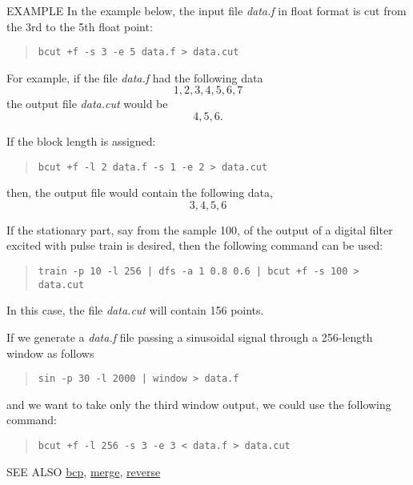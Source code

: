 \begin{qsection}{EXAMPLE}
In the example below, the input file {\em data.f} in float format
is cut from the 3rd to the 5th float point:
\begin{quote}
 \verb!bcut +f -s 3 -e 5 data.f > data.cut!
\end{quote}
For example, if the file {\em data.f} had the following data
\begin{displaymath}
  1, 2, 3, 4, 5, 6, 7
\end{displaymath}
the output file {\em data.cut} would be 
\begin{displaymath}
  4, 5, 6.
\end{displaymath}
\par
If the block length is assigned:
\begin{quote}
 \verb!bcut +f -l 2 data.f -s 1 -e 2 > data.cut!
\end{quote}
then, the output file would contain the following data,
\begin{displaymath}
  3, 4, 5, 6
\end{displaymath}
\par
If the stationary part, say from the sample 100,
of the output of a digital filter excited with
pulse train is desired, then the following command can be used:
\begin{quote}
  \verb!train -p 10 -l 256 | dfs -a 1 0.8 0.6 | bcut +f -s 100 > data.cut!
\end{quote}
In this case, the file {\em data.cut} will contain 156 points.
\par
If we generate a {\em data.f} file passing a sinusoidal signal
through a 256-length window as follows
\begin{quote}
  \verb!sin -p 30 -l 2000 | window > data.f!
\end{quote}
and we want to take only the third window output,
we could use the following command:
\begin{quote}
  \verb!bcut +f -l 256 -s 3 -e 3 < data.f > data.cut!
\end{quote}
\end{qsection}

\begin{qsection}{SEE ALSO}
\hyperlink{bcp}{bcp},
\hyperlink{merge}{merge},
\hyperlink{reverse}{reverse}
\end{qsection}
